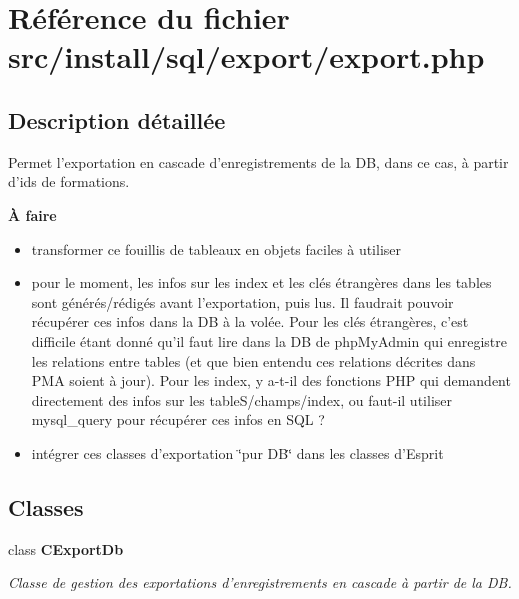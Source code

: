 \section{Référence du fichier src/install/sql/export/export.php}
\label{export_8php}


\subsection{Description détaillée}
Permet l'exportation en cascade d'enregistrements de la DB, dans ce cas, à partir d'ids de formations. 

\begin{Desc}
\item[{\bf À faire}]\begin{itemize}
\item transformer ce fouillis de tableaux en objets faciles à utiliser\item pour le moment, les infos sur les index et les clés étrangères dans les tables sont générés/rédigés avant l'exportation, puis lus. Il faudrait pouvoir récupérer ces infos dans la DB à la volée. Pour les clés étrangères, c'est difficile étant donné qu'il faut lire dans la DB de phpMyAdmin qui enregistre les relations entre tables (et que bien entendu ces relations décrites dans PMA soient à jour). Pour les index, y a-t-il des fonctions PHP qui demandent directement des infos sur les tableS/champs/index, ou faut-il utiliser mysql\_\-query pour récupérer ces infos en SQL ?\item intégrer ces classes d'exportation \char`\"{}pur DB\char`\"{} dans les classes d'Esprit \end{itemize}
\end{Desc}


\subsection*{Classes}
\begin{CompactItemize}
\item 
class {\bf CExportDb}
\begin{CompactList}\small\item\em Classe de gestion des exportations d'enregistrements en cascade à partir de la DB. \item\end{CompactList}\end{CompactItemize}
